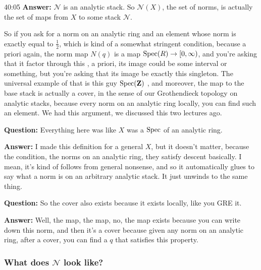 \begin{example}
\begin{unfinished}{40:05}
\textbf{Answer:} $\mathcal{N}$ is an analytic stack. So $\mathcal{N}(X)$, the set of norms, is actually the set of maps from $X$ to some stack $\mathcal{N}$.

So if you ask for a norm on an analytic ring and an element whose norm is exactly equal to $\frac{1}{2}$, which is kind of a somewhat stringent condition, because a priori again, the norm map $N(q)$ is a map $\operatorname{Spec}(R) \to [0, \infty)$, and you're asking that it factor through this , a priori, its image could be some interval or something, but you're asking that its image be exactly this singleton. The universal example of that is this guy $\operatorname{Spec}(\mathbf Z)$ , and moreover, the map to the base stack is actually a cover, in the sense of our Grothendieck topology on analytic stacks, because every norm on an analytic ring locally, you can find such an element. We had this argument, we discussed this two lectures ago. 

\textbf{Question:} Everything here was like $X$ was a $\operatorname{Spec}$ of an analytic ring. 

\textbf{Answer:} I made this definition for a general $X$, but it doesn't matter, because the condition, the norms on an analytic ring, they satisfy descent basically. I mean, it's kind of follows from general nonsense, and so it automatically glues to say what a norm is on an arbitrary analytic stack. It just unwinds to the same thing. 

\textbf{Question:} So the cover also exists because it exists locally, like you GRE it. 

\textbf{Answer:} Well, the map, the map, no, the map exists because you can write down this norm, and then it's a cover because given any norm on an analytic ring, after a cover, you can find a $q$ that satisfies this property.


\subsubsection{What does $\mathcal{N}$ look like?} \label{subsubsec:what_does_n_look_like}


\end{unfinished}
\end{example}
